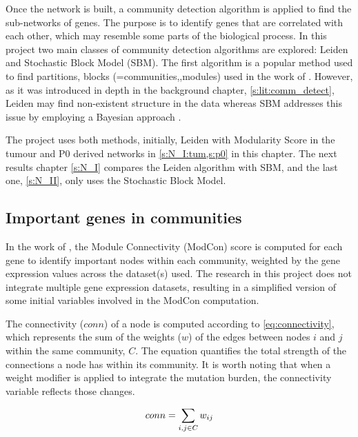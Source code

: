 Once the network is built, a community detection algorithm is applied to find the sub-networks of genes. The purpose is to identify genes that are correlated with each other, which may resemble some parts of the biological process. In this project two main classes of community detection algorithms are explored: Leiden and Stochastic Block Model (SBM). The first algorithm is a popular method used to find partitions, blocks (=communities,,modules) used in the work of \citet{Care2019-ij}. However, as it was introduced in depth in the background chapter, \cref{s:lit:comm_detect}, Leiden may find non-existent structure in the data \citep{Peixoto2021-jx} whereas SBM addresses this issue by employing a Bayesian approach \citep{Peixoto2019-fg}. 

The project uses both methods, initially, Leiden with Modularity Score in the tumour and P0 derived networks in \cref{s:N_I:tum,s:p0} in this chapter. The next results chapter \cref{s:N_I} compares the Leiden algorithm with SBM, and the last one, \cref{s:N_II}, only uses the Stochastic Block Model.


\subsection{Important genes in communities} \label{s:N_I:methods_modcon}

In the work of \citet{Care2019-ij}, the Module Connectivity (ModCon) score is computed for each gene to identify important nodes within each community, weighted by the gene expression values across the dataset(s) used. The research in this project does not integrate multiple gene expression datasets, resulting in a simplified version of some initial variables involved in the ModCon computation.

The connectivity ($conn$) of a node is computed according to \cref{eq:connectivity}, which represents the sum of the weights ($w$) of the edges between nodes $i$ and $j$ within the same community, $C$. The equation quantifies the total strength of the connections a node has within its community. It is worth noting that when a weight modifier is applied to integrate the mutation burden, the connectivity variable reflects those changes.

\begin{equation} \label{eq:connectivity}
    conn = \sum_{\substack{i, j \in C}} w_{ij} \\
\end{equation}

